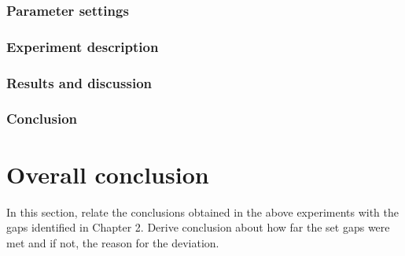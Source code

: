 \subsubsection{Parameter settings}
\subsubsection{Experiment description}
\subsubsection{Results and discussion}
\subsubsection{Conclusion}

\section{Overall conclusion}
In this section, relate the conclusions obtained in the above experiments with the gaps identified in Chapter 2. Derive conclusion about how far the set gaps were met and if not, the reason for the deviation.